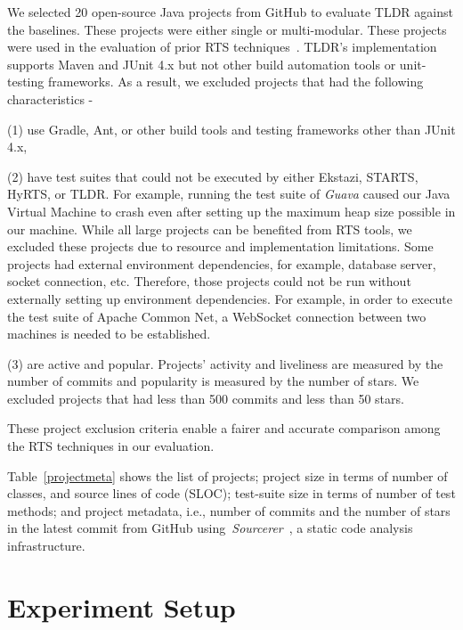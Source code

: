 We selected 20 open-source Java projects from GitHub to evaluate TLDR against the baselines. These projects were either single or multi-modular. These projects were used in the evaluation of prior RTS techniques~\cite{gligoric2015ekstazi,hyrts,starts,legunsen2016extensive}. TLDR's implementation supports Maven and JUnit 4.x but not other build automation tools or unit-testing frameworks. As a result, we excluded projects that had the following characteristics - 

(1) use Gradle, Ant, or other build tools and testing frameworks other than JUnit 4.x, 

(2) have test suites that could not be executed by either Ekstazi, STARTS, HyRTS, or TLDR. For example, running the test suite of \textit{Guava} caused our Java Virtual Machine to crash even after setting up the maximum heap size possible in our machine. While all large projects can be benefited from RTS tools, we excluded these projects due to resource and implementation limitations. Some projects had external environment dependencies, for example, database server, socket connection, etc. Therefore, those projects could not be run without externally setting up environment dependencies. For example, in order to execute the test suite of Apache Common Net, a WebSocket connection between two machines is needed to be established. 

(3) are active and popular. Projects' activity and liveliness are measured by the number of commits and popularity is measured by the number of stars. We excluded projects that had less than 500 commits and less than 50 stars. 

These project exclusion criteria enable a fairer and accurate comparison among the RTS techniques in our evaluation.

Table~\ref{projectmeta} shows the list of projects; project size in terms of number of classes, and source lines of code (SLOC); test-suite size in terms of number of test methods; and project metadata, i.e., number of commits and the number of stars in the latest commit from GitHub using~\textit{Sourcerer}~\cite{linstead2009sourcerer}, a static code analysis infrastructure. 

\section{Experiment Setup}


